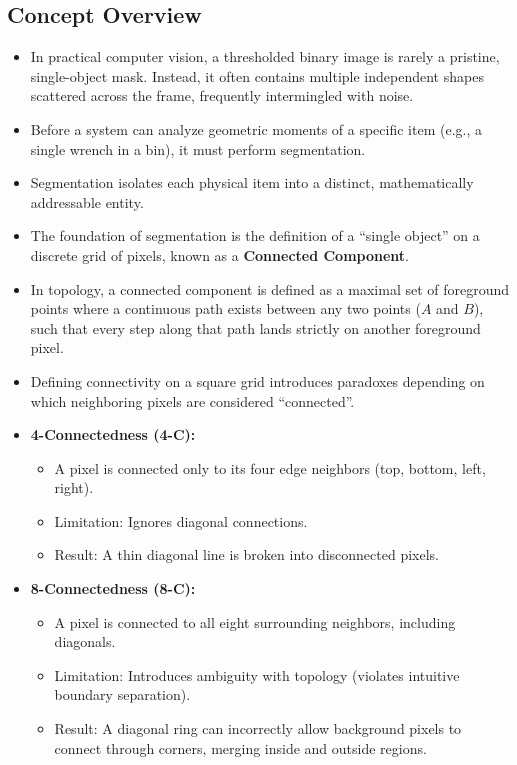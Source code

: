 \documentclass[12pt]{article}
\begin{document}
\subsection{Concept Overview}
\begin{itemize}
    \item In practical computer vision, a thresholded binary image is rarely a pristine, single-object mask. Instead, it often contains multiple independent shapes scattered across the frame, frequently intermingled with noise.

    \item Before a system can analyze geometric moments of a specific item (e.g., a single wrench in a bin), it must perform segmentation.

    \item Segmentation isolates each physical item into a distinct, mathematically addressable entity.

    \item The foundation of segmentation is the definition of a ``single object'' on a discrete grid of pixels, known as a \textbf{Connected Component}.

    \item In topology, a connected component is defined as a maximal set of foreground points where a continuous path exists between any two points ($A$ and $B$), such that every step along that path lands strictly on another foreground pixel.

    \item Defining connectivity on a square grid introduces paradoxes depending on which neighboring pixels are considered ``connected''.

    \item \textbf{4-Connectedness (4-C):}
          \begin{itemize}
              \item A pixel is connected only to its four edge neighbors (top, bottom, left, right).
              \item Limitation: Ignores diagonal connections.
              \item Result: A thin diagonal line is broken into disconnected pixels.
          \end{itemize}

    \item \textbf{8-Connectedness (8-C):}
          \begin{itemize}
              \item A pixel is connected to all eight surrounding neighbors, including diagonals.
              \item Limitation: Introduces ambiguity with topology (violates intuitive boundary separation).
              \item Result: A diagonal ring can incorrectly allow background pixels to connect through corners, merging inside and outside regions.
          \end{itemize}


\end{itemize}
\end{document}
